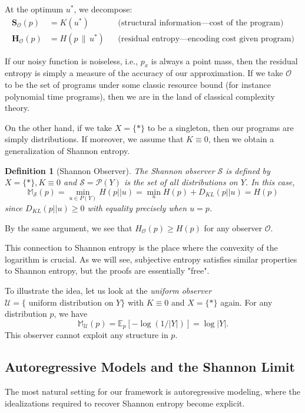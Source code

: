 \documentclass[11pt]{article}
\newtheorem{definition}{Definition}
\begin{document}
At the optimum $u^*$, we decompose:
\begin{align}
\mathbf{S}_\mathcal{O}(p) &= K(u^*) && \text{(structural information---cost of the program)} \\
\mathbf{H}_\mathcal{O}(p) &= H(p \,\|\, u^*) && \text{(residual entropy---encoding cost given program)}
\end{align}


If our noisy function is noiseless, i.e., $p_x$ is always a point mass, then the residual entropy is simply a measure of the accuracy of our approximation. If we take $\mathcal O$ to be the set of programs under some classic resource bound (for instance polynomial time programs), then we are in the land of classical complexity theory.

On the other hand, if we take $X = \{*\}$ to be a singleton, then our programs are simply distributions. If moreover, we assume that $K \equiv 0$, then we obtain a generalization of Shannon entropy.

\begin{definition}[Shannon Observer]
    The Shannon observer $\mathcal S$ is defined by $X = \{*\}, K \equiv 0$ and $\mathcal S = \mathcal P(Y)$ is the set of \textit{all} distributions on $Y$. In this case,
    \[ \mathbb M_\mathcal S(p) = \min_{u \in P(Y)} H(p||u) = \min_u H(p) + D_{KL}(p||u) = H(p)\]
since $D_{KL}(p||u) \geq 0$ with equality precisely when $u = p$.
\end{definition}

By the same argument, we see that $H_\mathcal O(p) \geq H(p)$ for any observer $\mathcal O$.

This connection to Shannon entropy is the place where the convexity of the logarithm is crucial. As we will see, subjective entropy satisfies similar properties to Shannon entropy, but the proofs are essentially "free".

To illustrate the idea, let us look at the \textit{uniform observer} $\mathcal U = \{\text{ uniform distribution on } Y\}$ with $K \equiv 0$ and $X = \{*\}$ again. For any distribution $p$, we have
\[ \mathbb M_\mathcal U(p) = \mathbb E_p[-\log(1/|Y|)] = \log|Y|.\]
This observer cannot exploit any structure in $p$. 

\subsection*{Autoregressive Models and the Shannon Limit}

The most natural setting for our framework is autoregressive modeling, where the idealizations required to recover Shannon entropy become explicit.
\end{document}
